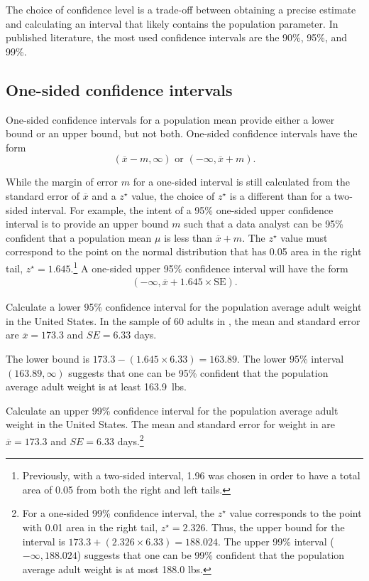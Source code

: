 The choice of confidence level is a trade-off between obtaining a precise estimate and calculating an interval that likely contains the population parameter. In published literature, the most used confidence intervals are the 90\%, 95\%, and 99\%. 

\subsection{One-sided confidence intervals}
\label{onesidedCIs}

One-sided confidence intervals for a population mean provide either a lower bound or an upper bound, but not both.  One-sided confidence intervals have the form
\[
(\overline{x} - m, \infty) \text{ or } (-\infty, \overline{x} + m).
\]

While the margin of error $m$ for a one-sided interval is still calculated from the standard error of $\overline{x}$ and a $z^\star$ value, the choice of $z^\star$ is a different than for a two-sided interval. For example, the intent of a 95\% one-sided upper confidence interval is to provide an upper bound $m$ such that a data analyst can be 95\% confident that a population mean $\mu$ is less than $\overline{x} + m$. The $z^\star$ value must correspond to the point on the normal distribution that has 0.05 area in the right tail, $z^{\star} = 1.645$.\footnote{Previously, with a two-sided interval, 1.96 was chosen in order to have a total area of 0.05 from both the right and left tails.} A one-sided upper 95\%  confidence interval will have the form
\begin{align*}
(-\infty, \overline{x} + 1.645 \times \text{SE}).
\end{align*}

\begin{example}
  {Calculate a lower 95\% confidence interval for the population average adult weight in the United States. In the sample of 60 adults in , the mean and standard error are $\overline{x} = 173.3$ and $SE = 6.33$ days.}
	
The lower bound is $173.3 - (1.645 \times 6.33) = 163.89$. The lower 95\% interval $(163.89, \infty)$ suggests that one can be 95\% confident that the population average adult weight is at least 163.9~lbs. 
\end{example}

\begin{exercise} Calculate an upper 99\% confidence interval for the population average adult weight in the United States. The mean and standard error for weight in  are $\overline{x} = 173.3$ and $SE = 6.33$ days.\footnote{For a one-sided 99\% confidence interval, the $z^\star$ value corresponds to the point with 0.01 area in the right tail, $z^\star = 2.326$. Thus, the upper bound for the interval is $173.3 + (2.326 \times 6.33) = 188.024.$ The upper 99\% interval ($-\infty, 188.024$) suggests that one can be 99\% confident that the population average adult weight is at most 188.0 lbs.}
	
\end{exercise}

